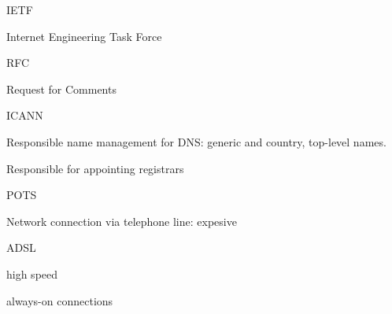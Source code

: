 \documentclass[main.tex]{subfiles}
\begin{document}
\small

\layer{}

\begin{card}{IETF}
\item Internet Engineering Task Force
\end{card}

\begin{card}{RFC}
\item Request for Comments
\end{card}

\begin{card}{ICANN}
\item Responsible name management for DNS: generic and country, top-level names.
\item Responsible for appointing registrars
\end{card}

\begin{card}{POTS}
\item Network connection via telephone line: expesive
\end{card}

\begin{card}{ADSL}
\item high speed
\item always-on connections
\end{card}
\end{document}
